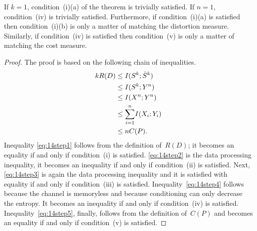 \begin{discussion}
  If $k = 1$, condition~(i)(a) of the theorem is trivially satisfied. If $n =
  1$, condition~(iv) is trivially satisfied. Furthermore, if condition~(i)(a) is
  satisfied then condition~(i)(b) is only a matter of matching the distortion
  measure. Similarly, if condition~(iv) is satisfied then condition~(v) is only
  a matter of matching the cost measure. 
\end{discussion}

\begin{proof}
  The proof is based on the following chain of inequalities.
  \begin{align}
    \label{eq:14step1}
    k R(D) &\le I(S^k; {\hat{S}}^k) \\
    \label{eq:14step2}
    &\le I(S^k; Y^n) \\
    \label{eq:14step3}
    &\le I(X^n; Y^n) \\
    \label{eq:14step4}
    &\le {\sum_{i=1}^n} I(X_i; Y_i)  \\
    \label{eq:14step5}
    &\le n C(P).
  \end{align}
  Inequality \eqref{eq:14step1} follows from the definition of~$R(D)$; it
  becomes an equality if and only if condition~(i) is satisfied.
  \eqref{eq:14step2} is the data processing inequality, it becomes an inequality
  if and only if condition~(ii) is satisfied. Next, \eqref{eq:14step3} is again
  the data processing inequality and it is satisfied with equality if and only
  if condition~(iii) is satisfied.  Inequality~\eqref{eq:14step4} follows
  because the channel is memoryless and because conditioning can only decrease
  the entropy. It becomes an inequality if and only if condition~(iv) is
  satisfied. Inequality~\eqref{eq:14step5}, finally, follows from the definition
  of~$C(P)$ and becomes an equality if and only if condition~(v) is satisfied.
\end{proof}


